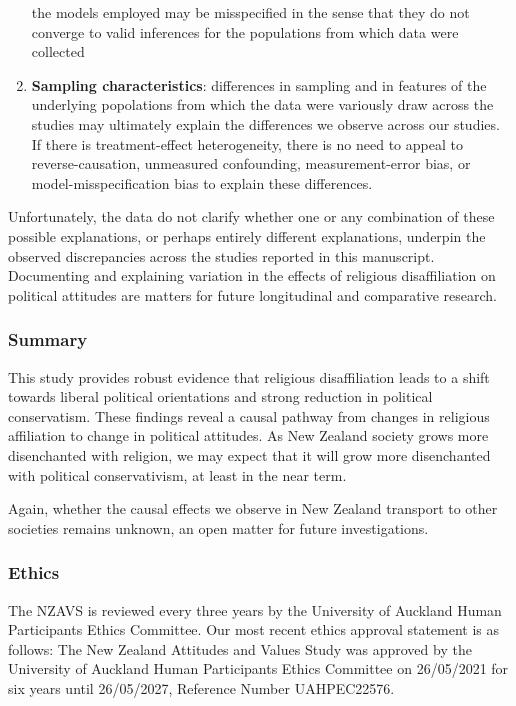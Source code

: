 \documentclass[
  singlecolumn]{article}
\begin{document}
\begin{enumerate}
  the models employed may be misspecified in the sense that they do not
  converge to valid inferences for the populations from which data were
  collected
\item
  \textbf{Sampling characteristics}: differences in sampling and in
  features of the underlying popolations from which the data were
  variously draw across the studies may ultimately explain the
  differences we observe across our studies. If there is
  treatment-effect heterogeneity, there is no need to appeal to
  reverse-causation, unmeasured confounding, measurement-error bias, or
  model-misspecification bias to explain these differences.
\end{enumerate}

Unfortunately, the data do not clarify whether one or any combination of
these possible explanations, or perhaps entirely different explanations,
underpin the observed discrepancies across the studies reported in this
manuscript. Documenting and explaining variation in the effects of
religious disaffiliation on political attitudes are matters for future
longitudinal and comparative research.

\subsubsection{Summary}\label{summary}

This study provides robust evidence that religious disaffiliation leads
to a shift towards liberal political orientations and strong reduction
in political conservatism. These findings reveal a causal pathway from
changes in religious affiliation to change in political attitudes. As
New Zealand society grows more disenchanted with religion, we may expect
that it will grow more disenchanted with political conservativism, at
least in the near term.

Again, whether the causal effects we observe in New Zealand transport to
other societies remains unknown, an open matter for future
investigations.

\newpage{}

\subsubsection{Ethics}\label{ethics}

The NZAVS is reviewed every three years by the University of Auckland
Human Participants Ethics Committee. Our most recent ethics approval
statement is as follows: The New Zealand Attitudes and Values Study was
approved by the University of Auckland Human Participants Ethics
Committee on 26/05/2021 for six years until 26/05/2027, Reference Number
UAHPEC22576.
\end{document}
